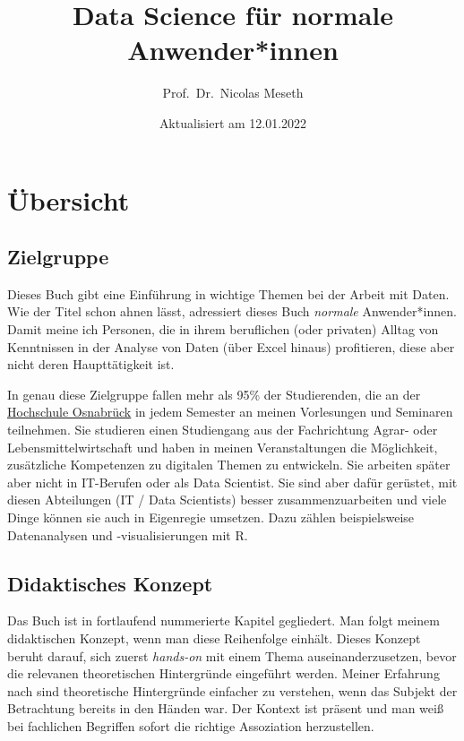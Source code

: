 \documentclass[
]{book}
\title{Data Science für normale Anwender*innen}
\author{Prof.~Dr.~Nicolas Meseth}
\date{Aktualisiert am 12.01.2022}
\begin{document}
\maketitle

{
\setcounter{tocdepth}{1}
\tableofcontents
}
\hypertarget{uxfcbersicht}{%
\chapter*{Übersicht}\label{uxfcbersicht}}

\hypertarget{zielgruppe}{%
\section*{Zielgruppe}\label{zielgruppe}}

Dieses Buch gibt eine Einführung in wichtige Themen bei der Arbeit mit Daten. Wie der Titel schon ahnen lässt, adressiert dieses Buch \emph{normale} Anwender*innen. Damit meine ich Personen, die in ihrem beruflichen (oder privaten) Alltag von Kenntnissen in der Analyse von Daten (über Excel hinaus) profitieren, diese aber nicht deren Haupttätigkeit ist.

In genau diese Zielgruppe fallen mehr als 95\% der Studierenden, die an der \href{https://hs-osnabrueck.de}{Hochschule Osnabrück} in jedem Semester an meinen Vorlesungen und Seminaren teilnehmen. Sie studieren einen Studiengang aus der Fachrichtung Agrar- oder Lebensmittelwirtschaft und haben in meinen Veranstaltungen die Möglichkeit, zusätzliche Kompetenzen zu digitalen Themen zu entwickeln. Sie arbeiten später aber nicht in IT-Berufen oder als Data Scientist. Sie sind aber dafür gerüstet, mit diesen Abteilungen (IT / Data Scientists) besser zusammenzuarbeiten und viele Dinge können sie auch in Eigenregie umsetzen. Dazu zählen beispielsweise Datenanalysen und -visualisierungen mit R.

\hypertarget{didaktisches-konzept}{%
\section*{Didaktisches Konzept}\label{didaktisches-konzept}}

Das Buch ist in fortlaufend nummerierte Kapitel gegliedert. Man folgt meinem didaktischen Konzept, wenn man diese Reihenfolge einhält. Dieses Konzept beruht darauf, sich zuerst \emph{hands-on} mit einem Thema auseinanderzusetzen, bevor die relevanen theoretischen Hintergründe eingeführt werden. Meiner Erfahrung nach sind theoretische Hintergründe einfacher zu verstehen, wenn das Subjekt der Betrachtung bereits in den Händen war. Der Kontext ist präsent und man weiß bei fachlichen Begriffen sofort die richtige Assoziation herzustellen.
\end{document}
